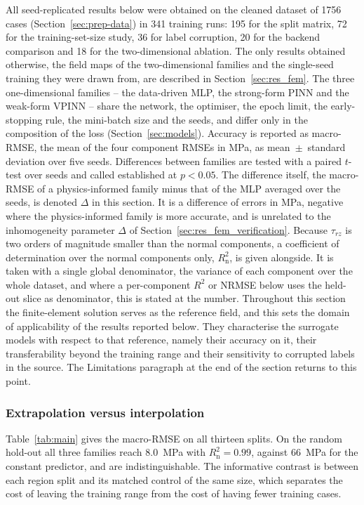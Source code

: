 \documentclass[pdflatex,sn-basic,Numbered]{sn-jnl}
\begin{document}
All seed-replicated results below were obtained on the cleaned dataset of 1756 cases (Section~\ref{sec:prep-data}) in 341 training runs: 195 for the split matrix, 72 for the training-set-size study, 36 for label corruption, 20 for the backend comparison and 18 for the two-dimensional ablation. The only results obtained otherwise, the field maps of the two-dimensional families and the single-seed training they were drawn from, are described in Section~\ref{sec:res_fem}.
The three one-dimensional families -- the data-driven MLP, the strong-form PINN and the weak-form VPINN -- share the network, the optimiser, the epoch limit, the early-stopping rule, the mini-batch size and the seeds, and differ only in the composition of the loss (Section~\ref{sec:models}). Accuracy is reported as macro-RMSE, the mean of the four component RMSEs in MPa, as mean~$\pm$~standard deviation over five seeds. Differences between families are tested with a paired $t$-test over seeds \citep{demsar2006} and called established at $p<0.05$. The difference itself, the macro-RMSE of a physics-informed family minus that of the MLP averaged over the seeds, is denoted $\Delta$ in this section. It is a difference of errors in MPa, negative where the physics-informed family is more accurate, and is unrelated to the inhomogeneity parameter $\Delta$ of Section~\ref{sec:res_fem_verification}. Because $\tau_{rz}$ is two orders of magnitude smaller than the normal components, a coefficient of determination over the normal components only, $R^2_{\mathrm{n}}$, is given alongside. It is taken with a single global denominator, the variance of each component over the whole dataset, and where a per-component $R^2$ or NRMSE below uses the held-out slice as denominator, this is stated at the number.
Throughout this section the finite-element solution serves as the reference field, and this sets the domain of applicability of the results reported below. They characterise the surrogate models with respect to that reference, namely their accuracy on it, their transferability beyond the training range and their sensitivity to corrupted labels in the source. The Limitations paragraph at the end of the section returns to this point.

\subsubsection{Extrapolation versus interpolation}
\label{sec:res_extrap}


Table~\ref{tab:main} gives the macro-RMSE on all thirteen splits. On the random hold-out all three families reach 8.0~MPa with $R^2_{\mathrm{n}}=0.99$, against 66~MPa for the constant predictor, and are indistinguishable. The informative contrast is between each region split and its matched control of the same size, which separates the cost of leaving the training range from the cost of having fewer training cases.
\end{document}
